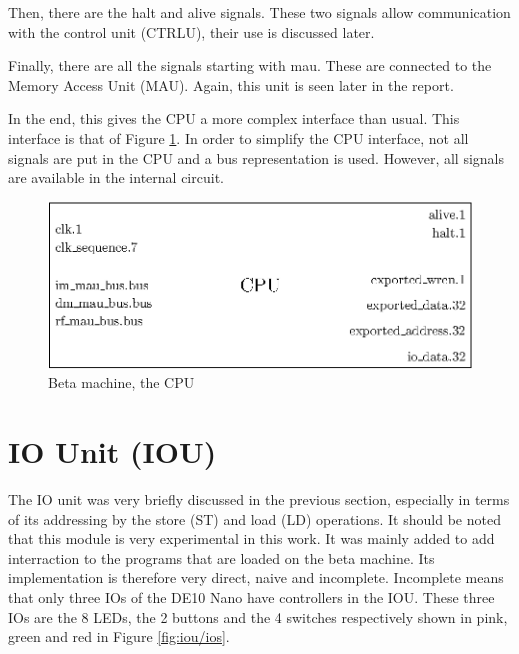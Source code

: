 Then, there are the halt and alive signals. These two signals allow communication with the control 
unit (CTRLU), their use is discussed later.

Finally, there are all the signals starting with mau. These are connected to the Memory Access Unit 
(MAU). Again, this unit is seen later in the report. 

In the end, this gives the CPU a more complex interface than usual. This interface is that of 
Figure \ref{fig:beta/interface}. In order to simplify the CPU interface, not all signals are put in 
the CPU and a bus representation is used. However, all signals are available in the internal circuit.

\begin{figure}[H]
    \centering
    \includegraphics[scale=0.8]{Chapter3-CPU/res/beta_machine}
    \caption{Beta machine, the CPU}
    \label{fig:beta/interface}
\end{figure}

\section{IO Unit (IOU)}

The IO unit was very briefly discussed in the previous section, especially in terms of its 
addressing by the store (ST) and load (LD) operations. It should be noted that this module is 
very experimental in this work. It was mainly added to add interraction to the programs that 
are loaded on the beta machine. Its implementation is therefore very direct, naive and 
incomplete. Incomplete means that only three IOs of the DE10 Nano have controllers in the IOU. 
These three IOs are the 8 LEDs, the 2 buttons and the 4 switches respectively shown in pink, green
and red in Figure \ref{fig:iou/ios}.

